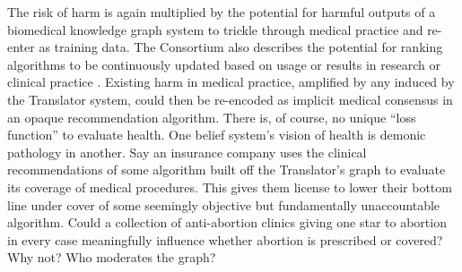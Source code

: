 The risk of harm is again multiplied by the potential for harmful
outputs of a biomedical knowledge graph system to trickle through
medical practice and re-enter as training data. The Consortium also
describes the potential for ranking algorithms to be continuously
updated based on usage or results in research or clinical
practice \cite{consortiumUniversalBiomedicalData2019} .
Existing harm in medical practice, amplified by any induced by the
Translator system, could then be re-encoded as implicit medical
consensus in an opaque recommendation algorithm. There is, of course, no
unique ``loss function'' to evaluate health. One belief system's vision
of health is demonic pathology in another. Say an insurance company uses
the clinical recommendations of some algorithm built off the
Translator's graph to evaluate its coverage of medical procedures. This
gives them license to lower their bottom line under cover of some
seemingly objective but fundamentally unaccountable algorithm. Could a
collection of anti-abortion clinics giving one star to abortion in every
case meaningfully influence whether abortion is prescribed or covered?
Why not? Who moderates the graph?

